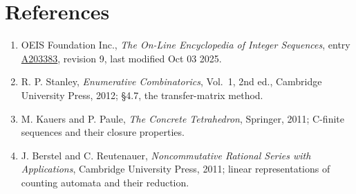 \documentclass[11pt]{article}
\theoremstyle{definition}
\begin{document}
\section{References}

\begin{enumerate}

\item OEIS Foundation Inc., \emph{The On-Line Encyclopedia of Integer Sequences}, entry \href{https://oeis.org/A203383}{A203383}, revision 9, last modified Oct 03 2025.

\item R. P. Stanley, \emph{Enumerative Combinatorics}, Vol.~1, 2nd ed., Cambridge University Press, 2012; \S4.7, the transfer-matrix method.

\item M. Kauers and P. Paule, \emph{The Concrete Tetrahedron}, Springer, 2011; C-finite sequences and their closure properties.

\item J. Berstel and C. Reutenauer, \emph{Noncommutative Rational Series with Applications}, Cambridge University Press, 2011; linear representations of counting automata and their reduction.

\end{enumerate}
\end{document}
